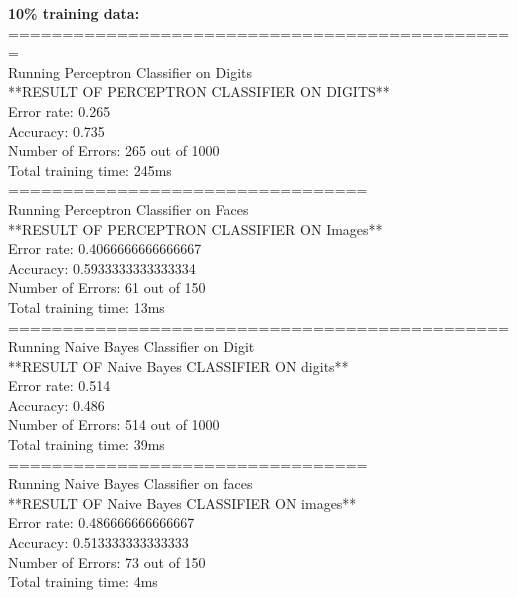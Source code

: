 \documentclass{article}
\begin{document}
        \textbf{10\% training data: }\\ ===============================================\\
        Running Perceptron Classifier on Digits\\
        **RESULT OF PERCEPTRON CLASSIFIER ON DIGITS**\\
        Error rate: 0.265 \\
        Accuracy: 0.735\\
        Number of Errors: 265 out of 1000\\
        Total training time: 245ms\\
        =================================\\
        Running Perceptron Classifier on Faces\\
        **RESULT OF PERCEPTRON CLASSIFIER ON Images**\\
        Error rate: 0.4066666666666667 \\
        Accuracy: 0.5933333333333334\\
        Number of Errors: 61 out of 150\\
        Total training time: 13ms\\
        
        
        ==============================================\\
        Running Naive Bayes Classifier on Digit\\
        **RESULT OF Naive Bayes CLASSIFIER ON digits**\\
        Error rate: 0.514 \\
        Accuracy: 0.486\\
        Number of Errors: 514 out of 1000\\
        Total training time: 39ms\\
        =================================\\
        Running Naive Bayes Classifier on faces\\
        **RESULT OF Naive Bayes CLASSIFIER ON images**\\
        Error rate: 0.486666666666667 \\
        Accuracy: 0.513333333333333\\
        Number of Errors: 73 out of 150\\
        Total training time: 4ms\\
        
\end{document}
